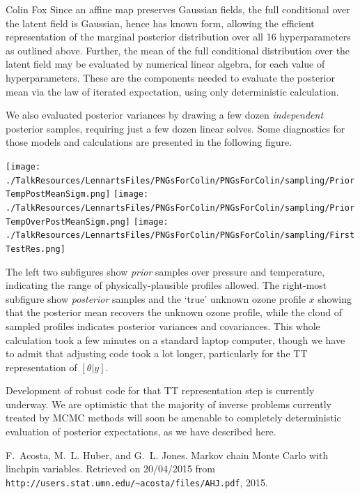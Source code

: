 \documentclass{owrart}
\theoremstyle{plain}
\begin{document}
\begin{talk}{Colin Fox}
Since an affine map preserves Gaussian fields, the full conditional over the latent field is Gaussian, hence has known form, allowing the efficient representation of the marginal posterior distribution over all 16 hyperparameters as outlined above. Further, the mean of the full conditional distribution over the latent field may be evaluated by numerical linear algebra, for each value of hyperparameters. These are the components needed to evaluate the posterior mean via the law of iterated expectation, using only deterministic calculation.

We also evaluated posterior variances by drawing a few dozen \emph{independent} posterior samples, requiring just a few dozen linear solves. Some diagnostics for those models and calculations are presented in the following figure.\\
  \centerline{
  \texttt{[image: ./TalkResources/LennartsFiles/PNGsForColin/PNGsForColin/sampling/PriorTempPostMeanSigm.png]}
  \texttt{[image: ./TalkResources/LennartsFiles/PNGsForColin/PNGsForColin/sampling/PriorTempOverPostMeanSigm.png]}
  \texttt{[image: ./TalkResources/LennartsFiles/PNGsForColin/PNGsForColin/sampling/FirstTestRes.png]}
  }
The left two subfigures show \emph{prior} samples over pressure and temperature, indicating the range of physically-plausible profiles allowed. The right-most subfigure show \emph{posterior} samples and the `true' unknown ozone profile $x$ showing that the posterior mean recovers the unknown ozone profile, while the cloud of sampled profiles indicates posterior variances and covariances. This whole calculation took a few minutes on a standard laptop computer, though we have to admit that adjusting code took a lot longer, particularly for the TT representation of $[\theta|y]$.

Development of robust code for that TT representation step is currently underway. We are optimistic that the majority of inverse problems currently treated by MCMC methods will soon be amenable to completely deterministic evaluation of posterior expectations, as we have described here.




\begin{thebibliography}{10}

F.~Acosta, M.~L. Huber, and G.~L. Jones.
\newblock Markov chain {M}onte {C}arlo with linchpin variables.
\newblock Retrieved on 20/04/2015 from
  \verb!http://users.stat.umn.edu/~acosta/files/AHJ.pdf!, 2015.


\end{thebibliography}
\end{talk}
\end{document}
